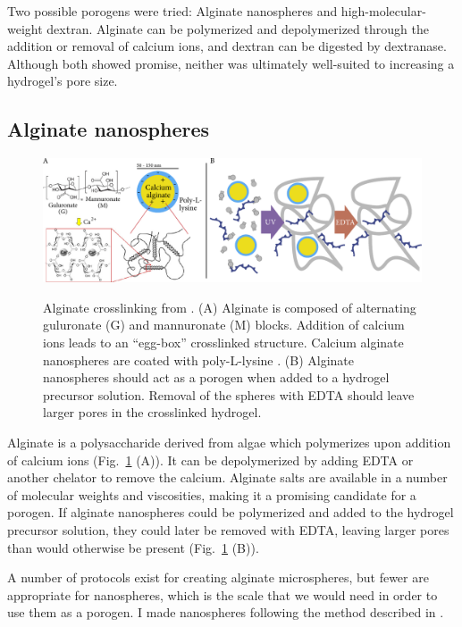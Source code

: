 Two possible porogens were tried: Alginate nanospheres and high-molecular-weight dextran.  Alginate can be polymerized and depolymerized through the addition or removal of calcium ions, and dextran can be digested by dextranase.  Although both showed promise, neither was ultimately well-suited to increasing a hydrogel's pore size.

\subsection{Alginate nanospheres}
\begin{figure}
\caption[Alginate nanospheres as porogens.]{Alginate crosslinking from \cite{bruchet15}.  (A) Alginate is composed of alternating guluronate (G) and mannuronate (M) blocks.  Addition of calcium ions leads to an ``egg-box'' crosslinked structure. Calcium alginate nanospheres are coated with poly-L-lysine \cite{de03}.  (B) Alginate nanospheres should act as a porogen when added to a hydrogel precursor solution.  Removal of the spheres with EDTA should leave larger pores in the crosslinked hydrogel.}
\centering
\includegraphics[width=\textwidth]{figs/ch03/alginate-cartoon2}
\label{fig:alginate}
\end{figure}

Alginate is a polysaccharide derived from algae which polymerizes upon addition of calcium ions (Fig.~\ref{fig:alginate} (A)).  It can be depolymerized by adding EDTA or another chelator to remove the calcium.  Alginate salts are available in a number of molecular weights and viscosities, making it a promising candidate for a porogen.  If alginate nanospheres could be polymerized and added to the hydrogel precursor solution, they could later be removed with EDTA, leaving larger pores than would otherwise be present (Fig.~\ref{fig:alginate} (B)).

A number of protocols exist for creating alginate microspheres, but fewer are appropriate for nanospheres, which is the scale that we would need in order to use them as a porogen.  I made nanospheres following the method described in \cite{de03}.

